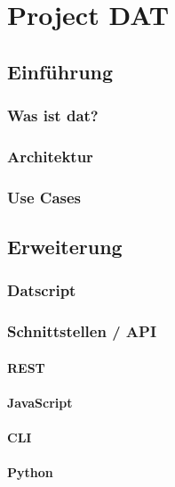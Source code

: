 \part{Project DAT}

\chapter{Einführung}

\section{Was ist dat?}

\section{Architektur}

\section{Use Cases}

\chapter{Erweiterung}

\section{Datscript}


\section{Schnittstellen / API}

\subsection{REST}

\subsection{JavaScript}

\subsection{CLI}

\subsection{Python}

